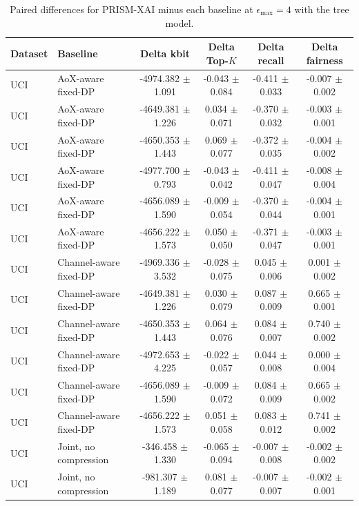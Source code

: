 \begin{table}[t]
\caption{Paired differences for PRISM-XAI minus each baseline at $\epsilon_{\max}=4$ with the tree model.}
\label{tab:paired-differences}
\centering
\scriptsize
\setlength{\tabcolsep}{3pt}
\begin{tabular}{llcccc}
\toprule
Dataset & Baseline & Delta kbit & Delta Top-$K$ & Delta recall & Delta fairness \\
\midrule
UCI & AoX-aware fixed-DP & -4974.382 $\pm$ 1.091 & -0.043 $\pm$ 0.084 & -0.411 $\pm$ 0.033 & -0.007 $\pm$ 0.002 \\
UCI & AoX-aware fixed-DP & -4649.381 $\pm$ 1.226 & 0.034 $\pm$ 0.071 & -0.370 $\pm$ 0.032 & -0.003 $\pm$ 0.001 \\
UCI & AoX-aware fixed-DP & -4650.353 $\pm$ 1.443 & 0.069 $\pm$ 0.077 & -0.372 $\pm$ 0.035 & -0.004 $\pm$ 0.002 \\
UCI & AoX-aware fixed-DP & -4977.700 $\pm$ 0.793 & -0.043 $\pm$ 0.042 & -0.411 $\pm$ 0.047 & -0.008 $\pm$ 0.004 \\
UCI & AoX-aware fixed-DP & -4656.089 $\pm$ 1.590 & -0.009 $\pm$ 0.054 & -0.370 $\pm$ 0.044 & -0.004 $\pm$ 0.001 \\
UCI & AoX-aware fixed-DP & -4656.222 $\pm$ 1.573 & 0.050 $\pm$ 0.050 & -0.371 $\pm$ 0.047 & -0.003 $\pm$ 0.001 \\
UCI & Channel-aware fixed-DP & -4969.336 $\pm$ 3.532 & -0.028 $\pm$ 0.075 & 0.045 $\pm$ 0.006 & 0.001 $\pm$ 0.002 \\
UCI & Channel-aware fixed-DP & -4649.381 $\pm$ 1.226 & 0.030 $\pm$ 0.079 & 0.087 $\pm$ 0.009 & 0.665 $\pm$ 0.001 \\
UCI & Channel-aware fixed-DP & -4650.353 $\pm$ 1.443 & 0.064 $\pm$ 0.076 & 0.084 $\pm$ 0.007 & 0.740 $\pm$ 0.002 \\
UCI & Channel-aware fixed-DP & -4972.653 $\pm$ 4.225 & -0.022 $\pm$ 0.057 & 0.044 $\pm$ 0.008 & 0.000 $\pm$ 0.004 \\
UCI & Channel-aware fixed-DP & -4656.089 $\pm$ 1.590 & -0.009 $\pm$ 0.072 & 0.084 $\pm$ 0.009 & 0.665 $\pm$ 0.002 \\
UCI & Channel-aware fixed-DP & -4656.222 $\pm$ 1.573 & 0.051 $\pm$ 0.058 & 0.083 $\pm$ 0.012 & 0.741 $\pm$ 0.002 \\
UCI & Joint, no compression & -346.458 $\pm$ 1.330 & -0.065 $\pm$ 0.094 & -0.007 $\pm$ 0.008 & -0.002 $\pm$ 0.002 \\
UCI & Joint, no compression & -981.307 $\pm$ 1.189 & 0.081 $\pm$ 0.077 & -0.007 $\pm$ 0.007 & -0.002 $\pm$ 0.001 \\

\end{tabular}
\end{table}
